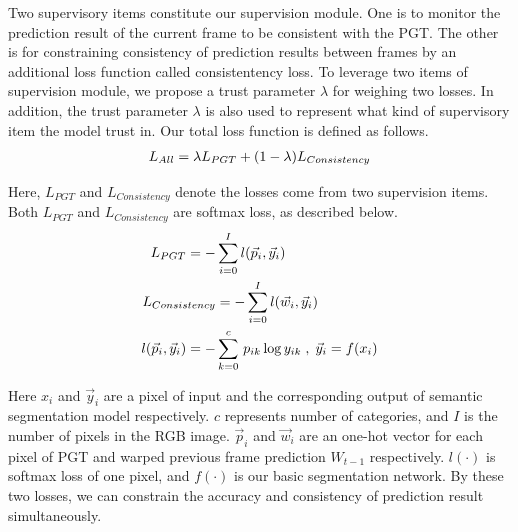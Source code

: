 Two supervisory items constitute our supervision module.
%
One is to monitor the prediction result of the current frame to be consistent with the PGT.
%
The other is for constraining consistency of prediction results between frames by an additional loss function called consistentency loss. 
%
To leverage two items of supervision module, we propose a trust parameter ${\lambda}$ for weighing two losses. 
%
In addition, the trust parameter ${\lambda}$ is also used to represent what kind of supervisory item the model trust in.
%
Our total loss function is defined as follows.
\begin{equation}
\centering
\begin{aligned}
L_{All}= \lambda L_{PGT} +(1-\lambda)L_{Consistency}
\end{aligned}
\end{equation}

Here, ${L_{PGT}}$ and ${L_{Consistency}}$ denote the losses come from two supervision items.
%
Both ${L_{PGT}}$ and ${L_{Consistency}}$ are softmax loss, as described below.
\begin{equation}
{
\vspace*{-0.6cm} 
\centering     
\begin{aligned}
L_{PGT} = -&\sum_{i=0}^Il(\vec p_i,\vec y_i) \\
L_{Consistency} &= -\sum_{i=0}^Il(\vec w_i,\vec y_i)\\
l(\vec p_i,\vec y_i) = -&\sum_{k=0}^c \,p_{ik}\log{y_{ik}}\;,\; \vec y_{i} = f(x_{i})\\
\end{aligned}
}
\end{equation}

Here ${x_i}$ and ${\vec y_i}$ are a pixel of input and the corresponding output of semantic segmentation model respectively. 
%
${c}$ represents number of categories, and ${I}$ is the number of pixels in the RGB image. 
%
${\vec p_i}$ and ${\vec w_i}$ are an one-hot vector for each pixel of PGT and warped previous frame prediction $W_{t-1}$ respectively. 
%
${l(\cdot)}$ is softmax loss of one pixel, and ${f(\cdot)}$ is our basic segmentation network. 
%
By these two losses, we can constrain the accuracy and consistency of prediction result simultaneously.
